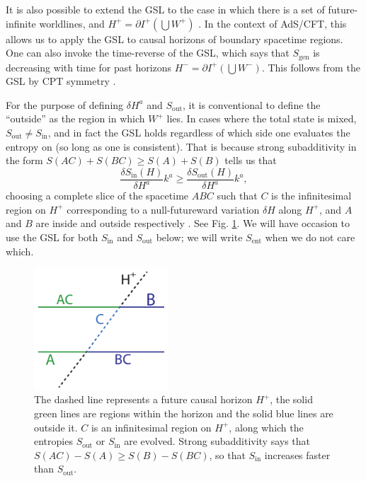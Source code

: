 \documentclass[12pt]{article}
\theoremstyle{remark}
\numberwithin{equation}{section}
\numberwithin{equation}{section}
\begin{document}
It is also possible to extend the GSL to the case in which there is a set of future-infinite worldlines, and $H^+ = \partial I^+(\bigcup W^+)$ \cite{Wall12}.  In the context of AdS/CFT, this allows us to apply the GSL to causal horizons of boundary spacetime regions.  One can also invoke the time-reverse of the GSL, which says that $S_\mathrm{gen}$ is decreasing with time for past horizons $H^- = \partial I^+(\bigcup W^-)$.  This follows from the GSL by CPT symmetry \cite{WallANEC}.

For the purpose of defining $\delta H^{a}$ and $S_\mathrm{out}$, it is conventional to define the ``outside'' as the region in which $W^+$ lies.  In cases where the total state is mixed,  $S_\mathrm{out} \ne S_\mathrm{in}$, and in fact the GSL holds regardless of which side one evaluates the entropy on (so long as one is consistent).  That is because strong subadditivity in the form $ S(AC) + S(BC) \ge S(A) + S(B)$ tells us that
\begin{equation}
\frac{\delta S_\mathrm{in}(H)}{\delta H^{a}}k^{a} \ge \frac{\delta S_\mathrm{out}(H)}{\delta H^{a}}k^{a},
\end{equation}
choosing a complete slice of the spacetime $ABC$ such that $C$ is the infinitesimal region on $H^+$ corresponding to a null-futureward variation $\delta H$ along $H^+$, and $A$ and $B$ are inside and outside respectively \cite{WallANEC}.  See Fig. \ref{HorizonSlice}.  We will have occasion to use the GSL for both $S_\mathrm{in}$ and $S_\mathrm{out}$ below; we will write $S_\mathrm{ent}$ when we do not care which.
\begin{figure}%
\begin{center}
\includegraphics[width=5cm]{HorizonSlice.pdf} 
\caption{The dashed line represents a future causal horizon $H^{+}$, the solid green lines are regions within the horizon and the solid blue lines are outside it. $C$ is an infinitesimal region on $H^{+}$, along which the entropies $S_\mathrm{out}$ or $S_\mathrm{in}$ are evolved. Strong subadditivity says that $S(AC)-S(A)\geq S(B)-S(BC)$, so that $S_\mathrm{in}$ increases faster than $S_\mathrm{out}$.
}
\label{HorizonSlice}
\end{center}
\end{figure}
\end{document}
